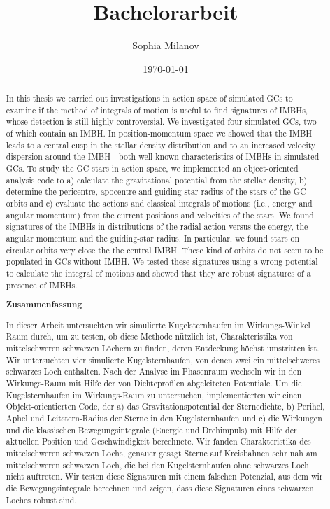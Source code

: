 \documentclass[a4paper,12pt,abstracton]{scrartcl}
\title{Bachelorarbeit}
\author{Sophia Milanov}
\date{\today}
\begin{document}
 

\onehalfspacing


\begin{abstract}
\hspace{-12pt}In this thesis we carried out investigations in action space of simulated \acp*{GC} to examine if the method of integrals of motion is useful to find signatures of \acp*{IMBH}, whose detection is still highly controversial. We investigated four simulated \acsp*{GC}, two of which contain an \acs*{IMBH}. In position-momentum space we showed that the \ac{IMBH} leads to a central cusp in the stellar density distribution and to an increased velocity dispersion around the \ac{IMBH} - both well-known characteristics of \acp{IMBH} in simulated \acp{GC}. To study the \ac{GC} stars in action space, we implemented an object-oriented analysis code to a) calculate the gravitational potential from the stellar density, b) determine the pericentre, apocentre and guiding-star radius of the stars of the GC orbits and c) evaluate the actions and classical integrals of motions (i.e., energy and angular momentum) from the current positions and velocities of the stars. We found signatures of the \acsp*{IMBH} in distributions of the radial action versus the energy, the angular momentum and the guiding-star radius. In particular, we found stars on circular orbits very close the the central \ac{IMBH}. These kind of orbits do not seem to be populated in \acp{GC} without \ac{IMBH}. We tested these signatures using a wrong potential to calculate the integral of motions and showed that they are robust signatures of a presence of \acsp*{IMBH}. 
\begin{center}
 \textbf{Zusammenfassung}
\end{center}
In dieser Arbeit untersuchten wir simulierte Kugelsternhaufen im Wirkungs-Winkel Raum durch, um zu testen, ob diese Methode nützlich ist, Charakteristika von mittelschweren schwarzen Löchern zu finden, deren Entdeckung höchst umstritten ist. Wir untersuchten vier simulierte Kugelsternhaufen, von denen zwei ein mittelschweres schwarzes Loch enthalten. Nach der Analyse im Phasenraum wechseln wir in den Wirkungs-Raum mit Hilfe der von Dichteprofilen abgeleiteten Potentiale. Um die Kugelsternhaufen im Wirkungs-Raum zu untersuchen, implementierten wir einen Objekt-orientierten Code, der a) das Gravitationspotential der Sternedichte, b) Perihel, Aphel und Leitstern-Radius der Sterne in den Kugelsternhaufen und c) die Wirkungen und die klassischen Bewegungsintegrale (Energie und Drehimpuls) mit Hilfe der aktuellen Position und Geschwindigkeit berechnete. Wir fanden Charakteristika des mittelschweren schwarzen Lochs, genauer gesagt Sterne auf Kreisbahnen sehr nah am mittelschweren schwarzen Loch, die bei den Kugelsternhaufen ohne schwarzes Loch nicht auftreten. Wir testen diese Signaturen mit einem falschen Potenzial, aus dem wir die Bewegungsintegrale berechnen und zeigen, dass diese Signaturen eines schwarzen Loches robust sind.
\end{abstract}
\end{document}
